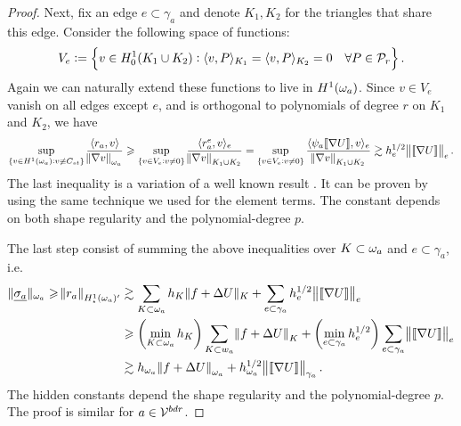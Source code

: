 \documentclass[thesis.tex]{subfiles}
\begin{document}
\begin{proof}
  
  Next, fix an edge $e \subset \gamma_a$ and denote $K_1, K_2$ for the triangles that share this edge. Consider the following space of functions:
  \[
  V_e := \set{v \in H_0^1(K_1 \cup K_2) :  \langle v,P \rangle_{K_1}=  \langle v,P \rangle_{K_2} = 0\quad \forall P \in \mathcal{P}_r}.\]
  Again we can naturally extend these functions to live in $H^1(\omega_a)$. Since $v \in V_e$ vanish on all edges except $e$, and
  is orthogonal to polynomials of degree $r$ on $K_1$ and $K_2$, we have
  \[
    \sup_{\{v \in H^1(\omega_a) : v \not \equiv C_{st}\}} { \langle r_a, v \rangle \over \norm{\nabla v}_{\omega_a}} 
    \geqslant \sup_{\{v \in V_e: v \ne 0\}} { \langle r^e_a, v \rangle_e \over \norm{\nabla v}_{K_1 \cup K_2}}
    = \sup_{\{v \in V_e: v \ne 0\}} { \langle \psi_a \llbracket \nabla U \rrbracket, v \rangle_e \over \norm{\nabla v}_{K_1 \cup K_2}}
          \gtrsim h_e^{1/2} \norm{\llbracket \nabla U \rrbracket}_e.
  \]
  The last inequality is a variation of a well known result \cite[Ex~9.x.7]{brenner}. It can be proven by using the same
  technique we used for the element terms. The constant depends on both shape regularity and the polynomial-degree $p$.

  The last step consist of summing the above inequalities over $K \subset \omega_a$ and $e \subset \gamma_a$, i.e.
  \begin{align*}
    \| \underline{\sigma_a} \|_{\omega_a} \geqslant \norm{r_a}_{H_\star^1(\omega_a)'} &\gtrsim \sum_{K \subset \omega_a} h_K \|f + \Delta U\|_K + \sum_{e \subset \gamma_a} h_e^{1/2} \norm{\llbracket \nabla U \rrbracket}_e\\
    &\geqslant \left(\min_{K \subset \omega_a} h_K\right) \sum_{K \subset w_a} \norm{f + \Delta U}_K +  \left(\min_{e \subset \gamma_a}h_e^{1/2} \right) \sum_{e \subset \gamma_a} \norm{\llbracket \nabla U \rrbracket}_e\\
    &\gtrsim h_{\omega_a} \norm{ f + \Delta U}_{\omega_a} + h_{\omega_a}^{1/2} \norm{ \llbracket \nabla U \rrbracket}_{\gamma_a}.
  \end{align*}
  The hidden constants depend the shape regularity and the polynomial-degree $p$. The proof is similar for $a \in \mathcal{V}^{bdr}$.
\end{proof}
\end{document}
